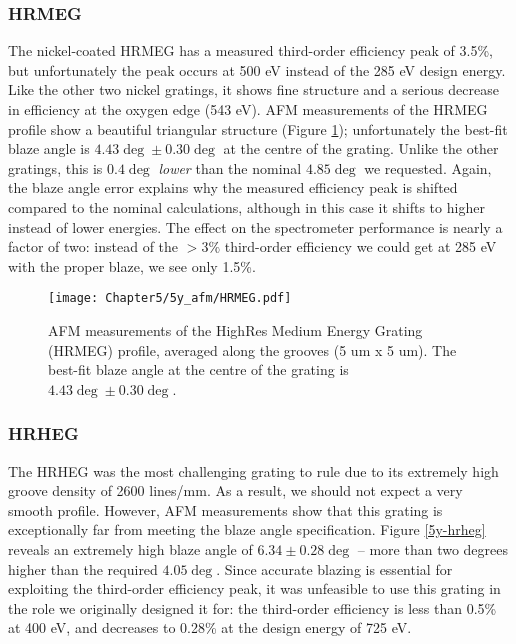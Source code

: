 \subsubsection{HRMEG}
The nickel-coated HRMEG has a measured third-order efficiency peak of 3.5\%, but unfortunately the peak occurs at 500 eV instead of the 285 eV design energy.  Like the other two nickel gratings, it shows fine structure and a serious decrease in efficiency at the oxygen edge (543 eV).  AFM measurements of the HRMEG profile show a beautiful triangular structure (Figure \ref{5y-hrmeg}); unfortunately the best-fit blaze angle is $4.43\deg \pm 0.30\deg$ at the centre of the grating.  Unlike the other gratings, this is $0.4\deg$ \emph{lower} than the nominal $4.85\deg$ we requested.  Again, the blaze angle error explains why the measured efficiency peak is shifted compared to the nominal calculations, although in this case it shifts to higher instead of lower energies.  The effect on the spectrometer performance is nearly a factor of two: instead of the $>3\%$ third-order efficiency we could get at 285 eV with the proper blaze, we see only 1.5\%.

\begin{figure}[htbp] %
   \centering
   \texttt{[image: Chapter5/5y\_afm/HRMEG.pdf]} 
   \caption{AFM measurements of the HighRes Medium Energy Grating (HRMEG) profile, averaged along the grooves (5 um x 5 um).  The best-fit blaze angle at the centre of the grating is $4.43\deg \pm 0.30\deg$.}
   \label{5y-hrmeg}
\end{figure}

\subsubsection{HRHEG}
The HRHEG was the most challenging grating to rule due to its extremely high groove density of 2600 lines/mm.  As a result, we should not expect a very smooth profile.  However, AFM measurements show that this grating is exceptionally far from meeting the blaze angle specification.  Figure \ref{5y-hrheg} reveals an extremely high blaze angle of $6.34 \pm 0.28\deg$ -- more than two degrees higher than the required $4.05\deg$.  Since accurate blazing is essential for exploiting the third-order efficiency peak, it was unfeasible to use this grating in the role we originally designed it for: the third-order efficiency is less than 0.5\% at 400 eV, and decreases to 0.28\% at the design energy of 725 eV.

